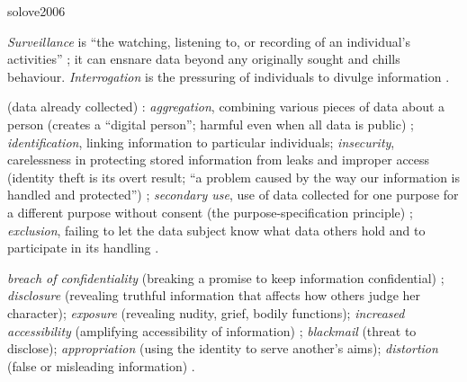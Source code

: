 \begin{papercard}{solove2006}
\begin{description}[nosep,leftmargin=1.2em,labelindent=0pt]
\item[A. Information collection] \emph{Surveillance} is ``the watching, listening to, or recording of an individual's activities'' ; it can ensnare data beyond any originally sought and chills behaviour. \emph{Interrogation} is the pressuring of individuals to divulge information .
\item[B. Information processing] (data already collected) : \emph{aggregation}, combining various pieces of data about a person (creates a ``digital person''; harmful even when all data is public) ; \emph{identification}, linking information to particular individuals; \emph{insecurity}, carelessness in protecting stored information from leaks and improper access (identity theft is its overt result; ``a problem caused by the way our information is handled and protected'') ; \emph{secondary use}, use of data collected for one purpose for a different purpose without consent (the purpose-specification principle) ; \emph{exclusion}, failing to let the data subject know what data others hold and to participate in its handling .
\item[C. Information dissemination] \emph{breach of confidentiality} (breaking a promise to keep information confidential) ; \emph{disclosure} (revealing truthful information that affects how others judge her character); \emph{exposure} (revealing nudity, grief, bodily functions); \emph{increased accessibility} (amplifying accessibility of information) ; \emph{blackmail} (threat to disclose); \emph{appropriation} (using the identity to serve another's aims); \emph{distortion} (false or misleading information) .

\end{description}
\end{papercard}
